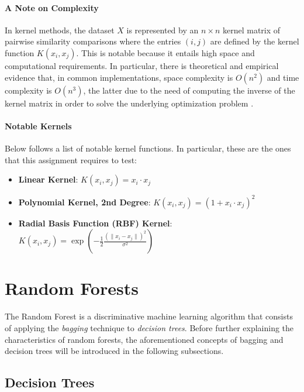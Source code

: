 \paragraph{A Note on Complexity} In kernel methods, the dataset $X$ is represented by an $n \times n$ kernel matrix of pairwise similarity comparisons where the entries $(i, j)$ are defined by the kernel function $K(x_i, x_j)$. This is notable because it entails high space and computational requirements. In particular, there is theoretical and empirical evidence that, in common implementations, space complexity is $O(n^2)$ and time complexity is $O(n^3)$, the latter due to the need of computing the inverse of the kernel matrix in order to solve the underlying optimization problem \cite{SVM_Complexity}. 

\paragraph{Notable Kernels} Below follows a list of notable kernel functions. In particular, these are the ones that this assignment requires to test: 

\begin{itemize}
    \item \textbf{Linear Kernel}: $K(x_i, x_j) = x_i \cdot x_j$

    \item \textbf{Polynomial Kernel, 2nd Degree}: $K(x_i, x_j) = (1 + x_i \cdot x_j)^2$

    \item \textbf{Radial Basis Function (RBF) Kernel}: $K(x_i, x_j) = \exp{(-\frac{1}{2} \frac{(\lVert x_i - x_j \rVert)^2}{\sigma^2})}$
\end{itemize}


\break
\section{Random Forests}

The Random Forest is a discriminative machine learning algorithm that consists of applying the \textit{bagging} technique to \textit{decision trees}. Before further explaining the characteristics of random forests, the aforementioned concepts of bagging and decision trees will be introduced in the following subsections.

\subsection{Decision Trees}

